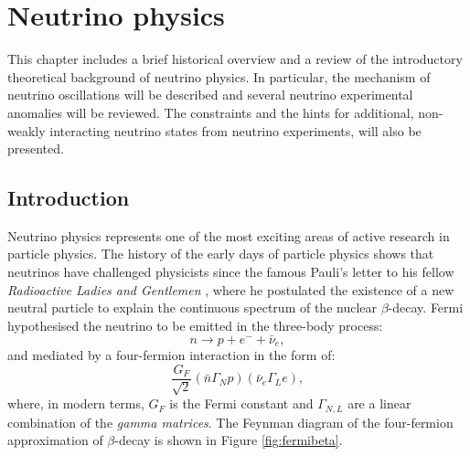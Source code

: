 

\chapter{\label{ch:2-neutrinophysics}Neutrino physics}

\minitoc

This chapter includes a brief historical overview and a review of the introductory theoretical background of neutrino physics. In particular, the mechanism of neutrino oscillations will be described and several neutrino experimental anomalies will be reviewed. The constraints and the hints for additional, non-weakly interacting neutrino states from neutrino experiments, will also be presented.

\section{Introduction}

Neutrino physics represents one of the most exciting areas of active research in particle physics. The history of the early days of particle physics shows that neutrinos have challenged physicists since the famous Pauli's letter to his fellow \emph{Radioactive Ladies and Gentlemen} \cite{Pauli:1930pc}, where he postulated the existence of a new neutral particle to explain the continuous spectrum of the nuclear $\beta$-decay.  Fermi hypothesised the neutrino to be emitted in the three-body process:
\begin{equation}
    n\rightarrow p + e^{-} + \bar{\nu}_{e},
\end{equation}
and mediated by a four-fermion interaction in the form of:
\begin{equation}
    \frac{G_{F}}{\sqrt{2}}(\bar{n}\Gamma_{N}p)(\bar{\nu}_{e}\Gamma_{L}e),
\end{equation}
where, in modern terms, $G_{F}$ is the Fermi constant and $\Gamma_{N,L}$ are a linear combination of the \emph{gamma matrices}. The Feynman diagram of the four-fermion approximation of $\beta$-decay is shown in Figure \ref{fig:fermibeta}.

